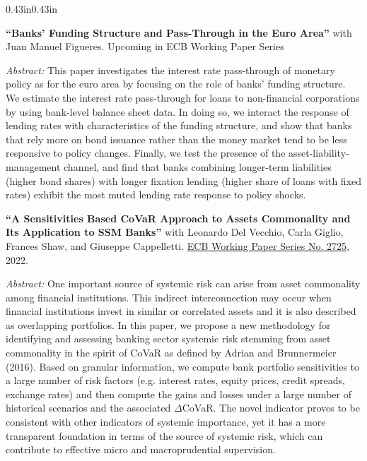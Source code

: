 \documentclass[10pt,a4paper]{article}
\newenvironment{cvbody}
  {\begin{adjustwidth}{0.43in}{0.43in}}
  {\end{adjustwidth}}
\newcommand{\paper}[3]{%
  \textbf{``#1''}#2\par
  \vspace{3pt}
  {\fontsize{8.3}{9.6}\selectfont\textit{Abstract:} #3\par}
  \vspace{6pt}
}
\begin{document}
\begin{cvbody}

  \paper{Banks' Funding Structure and Pass-Through in the Euro Area}{ with Juan Manuel Figueres. Upcoming in ECB Working Paper Series}{This paper investigates the interest rate pass-through of monetary policy as for the euro area by focusing on the role of banks' funding structure. We estimate the interest rate pass-through for loans to non-financial corporations by using bank-level balance sheet data. In doing so, we interact the response of lending rates with characteristics of the funding structure, and show that banks that rely more on bond issuance rather than the money market tend to be less responsive to policy changes. Finally, we test the presence of the asset-liability-management channel, and find that banks combining longer-term liabilities (higher bond shares) with longer fixation lending (higher share of loans with fixed rates) exhibit the most muted lending rate response to policy shocks.}

\vspace{4pt}
 
  \paper{A Sensitivities Based CoVaR Approach to Assets Commonality and Its Application to SSM Banks}{ with Leonardo Del Vecchio, Carla Giglio, Frances Shaw, and Giuseppe Cappelletti. \href{https://www.ecb.europa.eu/pub/pdf/scpwps/ecb.wp2725~8ecb5a7ea3.en.pdf}{ECB Working Paper Series No. 2725}, 2022.}{ One important source of systemic risk can arise from asset commonality among financial institutions. This indirect interconnection may occur when financial institutions invest in similar or correlated assets and it is also described as overlapping portfolios. In this paper, we propose a new methodology for identifying and assessing banking sector systemic risk stemming from asset commonality in the spirit of CoVaR as defined by Adrian and Brunnermeier (2016). Based on granular information, we compute bank portfolio sensitivities to a large number of risk factors (e.g. interest rates, equity prices, credit spreads, exchange rates) and then compute the gains and losses under a large number of historical scenarios and the associated $\Delta$CoVaR. The novel indicator proves to be consistent with other indicators of systemic importance, yet it has a more transparent foundation in terms of the source of systemic risk, which can contribute to effective micro and macroprudential supervision. }

\end{cvbody}
\end{document}
